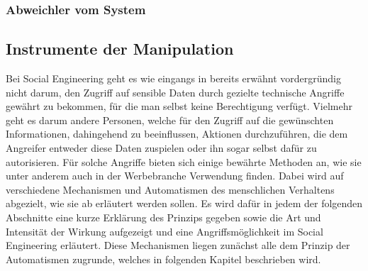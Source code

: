 \subsubsection{Abweichler vom System}

\cite{liars-and-outliers}

\subsection{Instrumente der Manipulation}\label{sec:instrumente_der_manipulation}
Bei Social Engineering geht es wie eingangs in  bereits erwähnt vordergründig
nicht darum, den Zugriff auf sensible Daten durch gezielte technische Angriffe gewährt zu bekommen,
für die man selbst keine Berechtigung verfügt.
Vielmehr geht es darum andere Personen, welche für den Zugriff auf die gewünschten Informationen, dahingehend
zu beeinflussen, Aktionen durchzuführen, die dem Angreifer entweder diese Daten zuspielen oder ihn sogar selbst
dafür zu autorisieren.
Für solche Angriffe bieten sich einige bewährte Methoden an, wie sie unter anderem auch in der Werbebranche
Verwendung finden.
Dabei wird auf verschiedene Mechanismen und Automatismen des menschlichen Verhaltens abgezielt, wie sie ab  erläutert werden sollen.
Es wird dafür in jedem der folgenden Abschnitte eine kurze Erklärung des Prinzips gegeben sowie die Art und
Intensität der Wirkung aufgezeigt und eine Angriffsmöglichkeit im Social Engineering erläutert.
Diese Mechanismen liegen zunächst alle dem Prinzip der Automatismen zugrunde, welches in folgenden Kapitel beschrieben wird.

